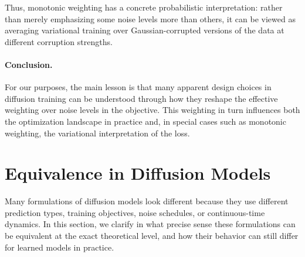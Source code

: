 Thus, monotonic weighting has a concrete probabilistic interpretation:
rather than merely emphasizing some noise levels more than others, it can be
viewed as averaging variational training over Gaussian-corrupted versions of
the data at different corruption strengths.

\paragraph{Conclusion.}
For our purposes, the main lesson is that many apparent design choices
in diffusion training can be understood through how they reshape the
effective weighting over noise levels in the objective. This weighting
in turn influences both the optimization landscape in practice and, in
special cases such as monotonic weighting, the variational
interpretation of the loss.




\clearpage
\newpage





\section{Equivalence in Diffusion Models}\label{sec:equivalent-parametrizations}
Many formulations of diffusion models look different because they use
different prediction types, training objectives, noise schedules, or
continuous-time dynamics. In this section, we clarify in what precise sense
these formulations can be equivalent at the exact theoretical level, and how
their behavior can still differ for learned models in practice.

